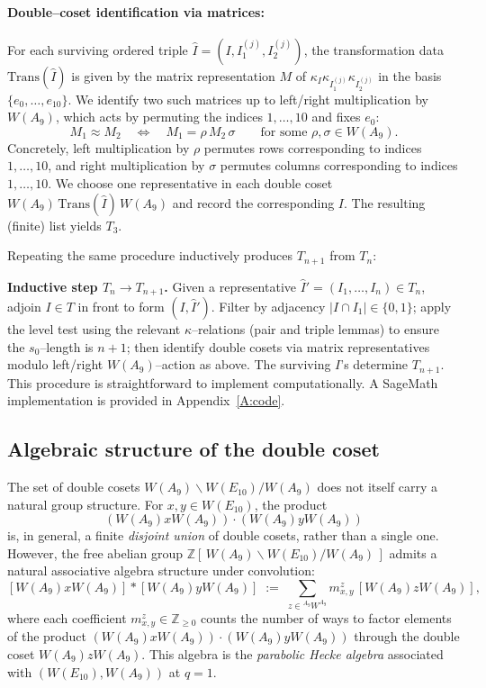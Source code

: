 \documentclass[11pt]{amsart}
\numberwithin{equation}{section}
\begin{document}
\paragraph{Double--coset identification via matrices:}
For each surviving ordered triple
$\widehat I=(I,I^{(j)}_1,I^{(j)}_2)$, the transformation data $\mathrm{Trans}(\widehat I)$ is given by
the matrix representation $M$ of
$\kappa_I\kappa_{I^{(j)}_1}\kappa_{I^{(j)}_2}$ in the basis
$\{e_0,\dots,e_{10}\}$.
We identify two such matrices up to left/right multiplication by
$W(A_9)$, which acts by permuting the indices $1,\dots,10$ and fixes $e_0$:
\[
M_1 \approx M_2 \quad \Leftrightarrow \quad
M_1 = \rho\, M_2\, \sigma
\qquad \text{for some }\rho,\sigma\in W(A_9).
\]
Concretely, left multiplication by $\rho$ permutes rows corresponding to indices $1,\dots,10$,
and right multiplication by $\sigma$ permutes columns corresponding to indices $1,\dots,10$.
We choose one representative in each double coset
$W(A_9)\,\mathrm{Trans}(\widehat I)\,W(A_9)$ and record the corresponding $I$.
The resulting (finite) list yields $T_3$.

\medskip
\noindent
Repeating the same procedure inductively produces $T_{n+1}$ from $T_n$:

\medskip
\noindent\textbf{Inductive step $T_n\to T_{n+1}$.}
Given a representative $\widehat I'=(I_1,\dots,I_n)\in T_n$,
adjoin $I\in T$ in front to form $(I,\widehat I')$.
Filter by adjacency $|I\cap I_1|\in\{0,1\}$; apply the level test using the
relevant $\kappa$--relations (pair and triple lemmas) to ensure the $s_0$--length is $n+1$;
then identify double cosets via matrix representatives modulo left/right
$W(A_9)$--action as above. The surviving $I$'s determine $T_{n+1}$.
This procedure is straightforward to implement computationally.
A SageMath implementation is provided in Appendix~\ref{A:code}.

%
\subsection{Algebraic structure of the double coset}\label{SS:algebraic-structure}
The set of double cosets \(W(A_9)\backslash W(E_{10})/W(A_9)\) does not itself
carry a natural group structure.  
For \(x,y\in W(E_{10})\), the product
\[
(W(A_9)xW(A_9))\cdot (W(A_9)yW(A_9))
\]
is, in general, a finite \emph{disjoint union} of double cosets,
rather than a single one.
However, the free abelian group
\(\mathbb{Z}[\,W(A_9)\backslash W(E_{10})/W(A_9)\,]\)
admits a natural associative algebra structure under convolution:
\[
[W(A_9)xW(A_9)]\ast[W(A_9)yW(A_9)]
\;:=\;
\sum_{z\in{}^{A_9}\!W^{A_9}}
m_{x,y}^z\,[W(A_9)zW(A_9)],
\]
where each coefficient \(m_{x,y}^z\in\mathbb{Z}_{\ge0}\)
counts the number of ways to factor elements of the product
\((W(A_9)xW(A_9))\cdot(W(A_9)yW(A_9))\)
through the double coset \(W(A_9)zW(A_9)\).
This algebra is the \emph{parabolic Hecke algebra} associated with
\((W(E_{10}),W(A_9))\) at \(q=1\).
\end{document}
